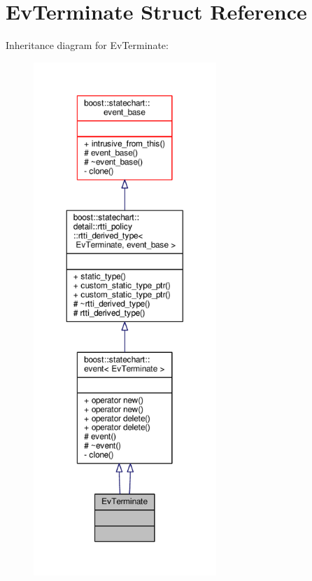 \hypertarget{struct_ev_terminate}{}\section{Ev\+Terminate Struct Reference}
\label{struct_ev_terminate}


Inheritance diagram for Ev\+Terminate\+:
\nopagebreak
\begin{figure}[H]
\begin{center}
\leavevmode
\includegraphics[height=550pt]{struct_ev_terminate__inherit__graph}
\end{center}
\end{figure}



